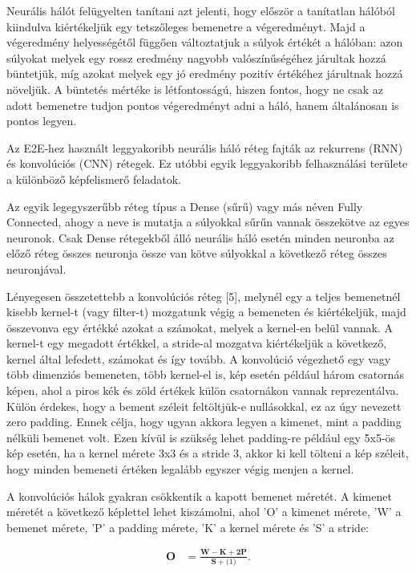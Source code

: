 Neurális hálót felügyelten tanítani azt jelenti, hogy először a tanítatlan hálóból kiindulva kiértékeljük egy tetszőleges bemenetre a végeredményt. Majd a végeredmény helyességétől függően változtatjuk a súlyok értékét a hálóban: azon súlyokat melyek egy rossz eredmény nagyobb valószínűségéhez járultak hozzá büntetjük, míg azokat melyek egy jó eredmény pozitív értékéhez járultnak hozzá növeljük. A büntetés mértéke is létfontosságú, hiszen fontos, hogy ne csak az adott bemenetre tudjon pontos végeredményt adni a háló, hanem általánosan is pontos legyen. 

Az E2E-hez használt leggyakoribb neurális háló réteg fajták az rekurrens (RNN) és konvolúciós (CNN) rétegek. Ez utóbbi egyik leggyakoribb felhasználási területe a különböző képfelismerő feladatok.

Az egyik legegyszerűbb réteg típus a Dense (sűrű) vagy más néven Fully Connected, ahogy a neve is mutatja a súlyokkal sűrűn vannak összekötve az egyes neuronok. Csak Dense rétegekből álló neurális háló esetén minden neuronba az előző réteg összes neuronja össze van kötve súlyokkal a következő réteg összes neuronjával.

Lényegesen összetettebb a konvolúciós réteg [5], melynél egy a teljes bemenetnél kisebb kernel-t (vagy filter-t) mozgatunk végig a bemeneten és kiértékeljük, majd összevonva egy értékké azokat a számokat, melyek a kernel-en belül vannak. A kernel-t egy megadott értékkel, a stride-al mozgatva kiértékeljük a következő, kernel által lefedett, számokat és így tovább. A konvolúció végezhető egy vagy több dimenziós bemeneten, több kernel-el is, kép esetén például három csatornás képen, ahol a piros kék és zöld értékek külön csatornákon vannak reprezentálva. Külön érdekes, hogy a bement széleit feltöltjük-e nullásokkal, ez az úgy nevezett zero padding. Ennek célja, hogy ugyan akkora legyen a kimenet, mint a padding nélküli bemenet volt. Ezen kívül is szükség lehet padding-re például egy 5x5-ös kép esetén, ha a kernel mérete 3x3 és a stride 3, akkor ki kell tölteni a kép széleit, hogy minden bemeneti értéken legalább egyszer végig menjen a kernel.

A konvolúciós hálok gyakran csökkentik a kapott bemenet méretét. A kimenet méretét a következő képlettel lehet kiszámolni, ahol ’O’ a kimenet mérete, ’W’ a bemenet mérete, ’P’ a padding mérete, ’K’ a kernel mérete és ’S’ a stride:

\begin{align}
\mathbf{O}&=\frac{\mathbf{W}-\mathbf{K}+\mathbf{2P}}{\mathbf{S}+\mathbf(1)}.
\end{align}

